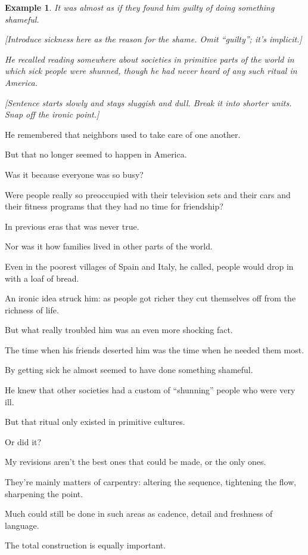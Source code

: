 \documentclass{book}
\numberwithin{equation}{section}
\newtheorem{example}{Example}[chapter]
\begin{document}
\begin{example}
    It was almost as if they found him guilty of doing something shameful.
    
    \emph{[Introduce sickness here as the reason for the shame. Omit ``guilty''; it's implicit.]}
    
    He recalled reading somewhere about societies in primitive parts of the world in which sick people were shunned, though he had never heard of any such ritual in America.
    
    \emph{[Sentence starts slowly and stays sluggish and dull. Break it into shorter units. Snap off the ironic point.]}
\end{example}
He remembered that neighbors used to take care of one another.

But that no longer seemed to happen in America.

Was it because everyone was so busy?

Were people really so preoccupied with their television sets and their cars and their fitness programs that they had no time for friendship?

In previous eras that was never true.

Nor was it how families lived in other parts of the world.

Even in the poorest villages of Spain and Italy, he called, people would drop in with a loaf of bread.

An ironic idea struck him: as people got richer they cut themselves off from the richness of life.

But what really troubled him was an even more shocking fact.

The time when his friends deserted him was the time when he needed them most.

By getting sick he almost seemed to have done something shameful.

He knew that other societies had a custom of ``shunning'' people who were very ill.

But that ritual only existed in primitive cultures.

Or did it?

%
My revisions aren't the best ones that could be made, or the only ones.

They're mainly matters of carpentry: altering the sequence, tightening the flow, sharpening the point.

Much could still be done in such areas as cadence, detail and freshness of language.

The total construction is equally important.
\end{document}
